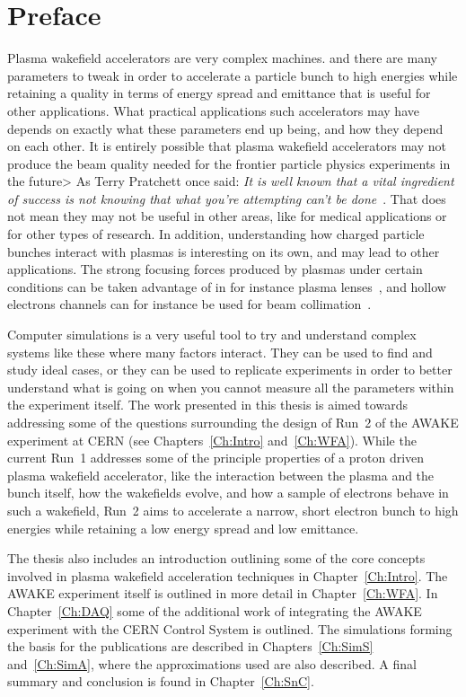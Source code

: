 \chapter*{Preface}

Plasma wakefield accelerators are very complex machines. and there are many parameters to tweak in order to accelerate a particle bunch to high energies while retaining a quality in terms of energy spread and emittance that is useful for other applications.
What practical applications such accelerators may have depends on exactly what these parameters end up being, and how they depend on each other.
It is entirely possible that plasma wakefield accelerators may not produce the beam quality needed for the frontier particle physics experiments in the future>
As Terry Pratchett once said: \textit{It is well known that a vital ingredient of success is not knowing that what you're attempting can't be done}~\cite{pratchett:1987}.
That does not mean they may not be useful in other areas, like for medical applications or for other types of research.
In addition, understanding how charged particle bunches interact with plasmas is interesting on its own, and may lead to other applications.
The strong focusing forces produced by plasmas under certain conditions can be taken advantage of in for instance plasma lenses~\cite{su:1990}, and hollow electrons channels can for instance be used for beam collimation~\cite{stancari:2014}.

Computer simulations is a very useful tool to try and understand complex systems like these where many factors interact.
They can be used to find and study ideal cases, or they can be used to replicate experiments in order to better understand what is going on when you cannot measure all the parameters within the experiment itself.
The work presented in this thesis is aimed towards addressing some of the questions surrounding the design of Run~2 of the AWAKE experiment at CERN (see Chapters~\ref{Ch:Intro} and~\ref{Ch:WFA}).
While the current Run~1 addresses some of the principle properties of a proton driven plasma wakefield accelerator, like the interaction between the plasma and the bunch itself, how the wakefields evolve, and how a sample of electrons behave in such a wakefield, Run~2 aims to accelerate a narrow, short electron bunch to high energies while retaining a low energy spread and low emittance.

The thesis also includes an introduction outlining some of the core concepts involved in plasma wakefield acceleration techniques in Chapter~\ref{Ch:Intro}.
The AWAKE experiment itself is outlined in more detail in Chapter~\ref{Ch:WFA}.
In Chapter~\ref{Ch:DAQ} some of the additional work of integrating the AWAKE experiment with the CERN Control System is outlined.
The simulations forming the basis for the publications are described in Chapters~\ref{Ch:SimS} and~\ref{Ch:SimA}, where the approximations used are also described.
A final summary and conclusion is found in Chapter~\ref{Ch:SnC}.

